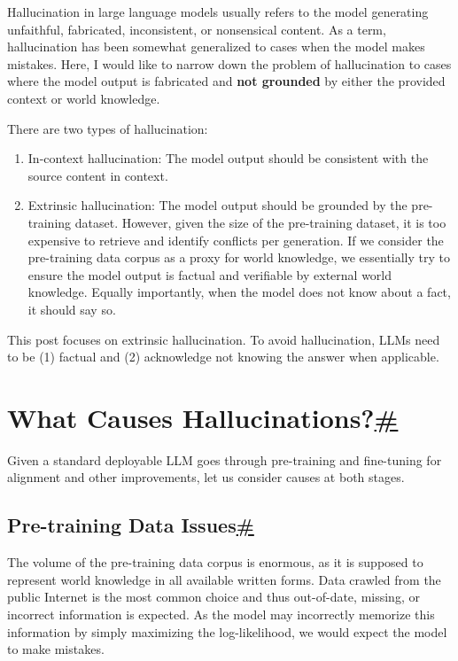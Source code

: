 Hallucination in large language models usually refers to the model generating unfaithful, fabricated, inconsistent, or nonsensical content. As a term, hallucination has been somewhat generalized to cases when the model makes mistakes. Here, I would like to narrow down the problem of hallucination to cases where the model output is fabricated and \textbf{not grounded} by either the provided context or world knowledge.

There are two types of hallucination:

\begin{enumerate}
\tightlist
\item
  In-context hallucination: The model output should be consistent with the source content in context.
\item
  Extrinsic hallucination: The model output should be grounded by the pre-training dataset. However, given the size of the pre-training dataset, it is too expensive to retrieve and identify conflicts per generation. If we consider the pre-training data corpus as a proxy for world knowledge, we essentially try to ensure the model output is factual and verifiable by external world knowledge. Equally importantly, when the model does not know about a fact, it should say so.
\end{enumerate}

This post focuses on extrinsic hallucination. To avoid hallucination, LLMs need to be (1) factual and (2) acknowledge not knowing the answer when applicable.

\section{\texorpdfstring{What Causes Hallucinations?\hyperref[what-causes-hallucinations]{\#}}{What Causes Hallucinations?\#}}\label{what-causes-hallucinations}

Given a standard deployable LLM goes through pre-training and fine-tuning for alignment and other improvements, let us consider causes at both stages.

\subsection{\texorpdfstring{Pre-training Data Issues\hyperref[pre-training-data-issues]{\#}}{Pre-training Data Issues\#}}\label{pre-training-data-issues}

The volume of the pre-training data corpus is enormous, as it is supposed to represent world knowledge in all available written forms. Data crawled from the public Internet is the most common choice and thus out-of-date, missing, or incorrect information is expected. As the model may incorrectly memorize this information by simply maximizing the log-likelihood, we would expect the model to make mistakes.

